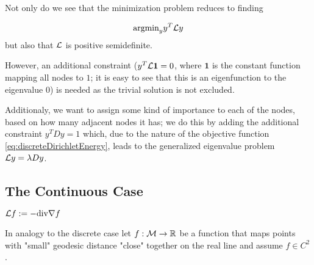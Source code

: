 Not only do we see that the minimization problem reduces to finding

\begin{equation*}
    \text{argmin}_y y^T\mathcal{L} y
\end{equation*}
but also that $\mathcal{L}$ is positive semidefinite.

However, an additional constraint ($y^T\mathcal{L}\mathbf{1}=0$, where $\mathbf{1}$ is the constant function mapping all nodes to $1$; it is easy to see that this is an eigenfunction to the eigenvalue $0$) is needed as the trivial solution is not excluded.

Additionaly, we want to assign some kind of importance to each of the nodes, based on how many adjacent nodes it has; we do this by adding the additional constraint $y^TDy=1$ which, due to the nature of the objective function \eqref{eq:discreteDirichletEnergy}, leads to the generalized eigenvalue problem $\mathcal{L} y=\lambda Dy$.


\subsection{The Continuous Case}
\begin{definition}
    $\mathcal{L} f:=-\mathrm{div}\nabla f$
\end{definition}

In analogy to the discrete case let $f:\mathcal{M}\rightarrow\mathbb{R}$ be a function that maps points with "small" geodesic distance "close" together on the real line and assume $f\in C^2$.